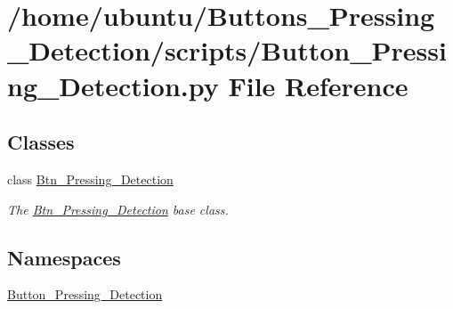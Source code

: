 \hypertarget{a00002}{}\section{/home/ubuntu/\+Buttons\+\_\+\+Pressing\+\_\+\+Detection/scripts/\+Button\+\_\+\+Pressing\+\_\+\+Detection.py File Reference}
\label{a00002}
\subsection*{Classes}
\begin{DoxyCompactItemize}
\item 
class \hyperlink{a00029}{Btn\+\_\+\+Pressing\+\_\+\+Detection}
\begin{DoxyCompactList}\small\item\em The \hyperlink{a00029}{Btn\+\_\+\+Pressing\+\_\+\+Detection} base class. \end{DoxyCompactList}\end{DoxyCompactItemize}
\subsection*{Namespaces}
\begin{DoxyCompactItemize}
\item 
 \hyperlink{a00020}{Button\+\_\+\+Pressing\+\_\+\+Detection}
\end{DoxyCompactItemize}
